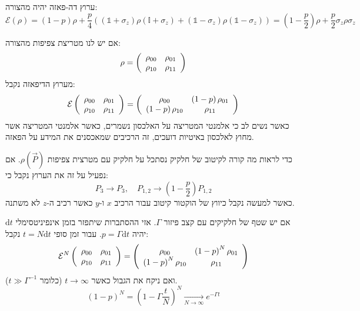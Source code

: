 \documentclass{tstextbook}
\begin{document}
\begin{corollary}
ערוץ דה-פאזה יהיה מהצורה:
$$\mathcal{E} \left(\rho\right)=\left(1-p\right)\rho+\frac{p}{4}\left(\left(\mathbb{1}+\sigma_{z}\right)\rho\left(\mathbb{I}+\sigma_{z}\right)+\left(\mathbb{1}-\sigma_{z}\right)\rho\left(\mathbb{1}-\sigma_{z}\right)\right)=\left(1-\frac{p}{2}\right)\rho+\frac{p}{2}\sigma_{z}\rho\sigma_{z}$$

\end{corollary}
\begin{proposition}
אם יש לנו מטריצת צפיפות מהצורה:
$$\rho=\left(\begin{array}{c c}{{\rho_{00}}}&{{\rho_{01}}}\\ {{\rho_{10}}}&{{\rho_{11}}}\end{array}\right)$$
מערוץ הדיפאזה נקבל:
$$\mathcal{E} \left(\begin{array}{c c}{{\rho_{00}}}&{{\rho_{01}}}\\ {{\rho_{10}}}&{{\rho_{11}}}\end{array}\right)=\left(\begin{array}{c c}{{\rho_{00}}}&{{\left(1-p\right)\rho_{01}}}\\ {{\left(1-p\right)\rho_{10}}}&{{\rho_{11}}}\end{array}\right)$$
כאשר נשים לב כי אלמנטי המטריצה על האלכסון נשמרים, כאשר אלמנטי המטריצה אשר מחוץ לאלכסון באיטיות דועכים, זה הרכיבים שמאכסנים את המידע על הפאזה.

\end{proposition}
\begin{remark}
כדי לראות מה קורה לקיטוב של חלקיק נסתכל על חלקיק עם מטרצית צפיפות \(\rho\left( \vec{P} \right)\). אם נפעיל על זה את הערוץ נקבל כי:
$$P_{3}\longrightarrow P_{3},\quad P_{1,2}\longrightarrow\left(1-\frac{p}{2}\right)P_{1,2}$$
כאשר למעשה נקבל כיווץ של הוקטור קיטוב עבור הרכיב \(x\) ו-\(y\) כאשר רכיב ה-\(z\) לא משתנה. 

\end{remark}
\begin{proposition}
אם יש שטף של חלקיקים עם קצב פיזור \(\Gamma\). אזי ההסתברות שיתפזר בזמן אינפיניטסימלי \(\mathrm{d}t\) יהיה \(p=\Gamma \mathrm{d}t\). עבור זמן סופי \(t=N\mathrm{d}t\) נקבל:
$$\mathcal{E} ^{N}\left(\begin{array}{c c}{{\rho_{00}}}&{{\rho_{01}}}\\ {{\rho_{10}}}&{{\rho_{11}}}\end{array}\right)=\left(\begin{array}{c c}{{\rho_{00}}}&{{\left(1-p\right)^{N}\rho_{01}}}\\ {{\left(1-p\right)^{N}\rho_{10}}}&{{\rho_{11}}}\end{array}\right)$$
ואם ניקח את הגבול כאשר \(t\to \infty\) (כלומר \(t\gg \Gamma^{-1}\)).
$$\left(1-p\right)^{N}=\left(1-\Gamma\frac{t}{N}\right)^{N}\underset{N\rightarrow\infty}{\longrightarrow}e^{-\Gamma t}$$

\end{proposition}
\end{document}

